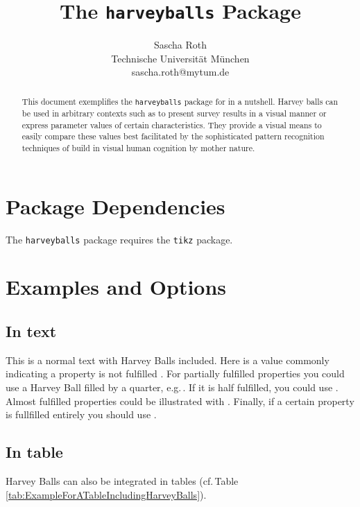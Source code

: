 \documentclass{article}%
\title{The \texttt{harveyballs} Package}
\author{Sascha Roth\\Technische Universit\"at M\"unchen\\sascha.roth@mytum.de}
\begin{document}
%
\maketitle



\newcommand{\pkgName}{\texttt{harveyballs}\xspace}

\begin{abstract}
This document exemplifies the \pkgName package for \LaTeXe in a nutshell. Harvey balls can be used in arbitrary contexts such as to present survey results in a visual manner or express parameter values of certain characteristics. They provide a visual means to easily compare these values best facilitated by the sophisticated pattern recognition techniques of build in visual human cognition by mother nature.
\end{abstract}

\section{Package Dependencies}

The \pkgName package requires the \texttt{tikz} package.


\section{Examples and Options}

\subsection{In text}

This is a normal text with Harvey Balls included.
Here is a value commonly indicating a property is not fulfilled \harveyBallNone.
For partially fulfilled properties you could use a Harvey Ball filled by a quarter, e.g.\,\harveyBallQuarter.
If it is half fulfilled, you could use \harveyBallHalf.
Almost fulfilled properties could be illustrated with \harveyBallThreeQuarter.
Finally, if a certain property is fullfilled entirely you should use \harveyBallFull.

\subsection{In table}
Harvey Balls can also be integrated in tables (cf.\,Table \ref{tab:ExampleForATableIncludingHarveyBalls}).
\end{document}
